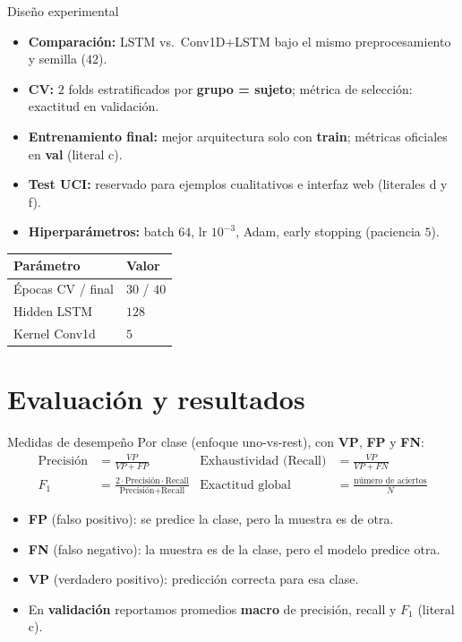 \documentclass[aspectratio=169]{beamer}
\begin{document}
\begin{frame}{Diseño experimental}
  \begin{itemize}
    \item \textbf{Comparación:} LSTM vs.\ Conv1D+LSTM bajo el mismo preprocesamiento y semilla ($42$).
    \item \textbf{CV:} $2$ folds estratificados por \textbf{grupo = sujeto}; métrica de selección: exactitud en validación.
    \item \textbf{Entrenamiento final:} mejor arquitectura solo con \textbf{train}; métricas oficiales en \textbf{val} (literal c).
    \item \textbf{Test UCI:} reservado para ejemplos cualitativos e interfaz web (literales d y f).
    \item \textbf{Hiperparámetros:} batch $64$, lr $10^{-3}$, Adam, early stopping (paciencia $5$).
  \end{itemize}
  \vspace{0.2cm}
  \small
  \centering
  \begin{tabular}{@{}ll@{}}
    \toprule
    Parámetro & Valor \\
    \midrule
    Épocas CV / final & $30$ / $40$ \\
    Hidden LSTM & $128$ \\
    Kernel Conv1d & $5$ \\
    \bottomrule
  \end{tabular}
\end{frame}

\section{Evaluación y resultados}

\begin{frame}{Medidas de desempeño}
  \small
  Por clase (enfoque uno-vs-rest), con \textbf{VP}, \textbf{FP} y \textbf{FN}:
  \vspace{0.15cm}
  \begin{align*}
    \text{Precisión} &= \frac{VP}{VP + FP}
    & \text{Exhaustividad (Recall)} &= \frac{VP}{VP + FN} \\[0.4em]
    F_1 &= \frac{2 \cdot \text{Precisión} \cdot \text{Recall}}{\text{Precisión} + \text{Recall}}
    & \text{Exactitud global} &= \frac{\text{número de aciertos}}{N}
  \end{align*}
  \vspace{0.1cm}
  \begin{itemize}
    \item \textbf{FP} (falso positivo): se predice la clase, pero la muestra es de otra.
    \item \textbf{FN} (falso negativo): la muestra es de la clase, pero el modelo predice otra.
    \item \textbf{VP} (verdadero positivo): predicción correcta para esa clase.
    \item En \textbf{validación} reportamos promedios \textbf{macro} de precisión, recall y $F_1$ (literal c).
  \end{itemize}
\end{frame}
\end{document}
